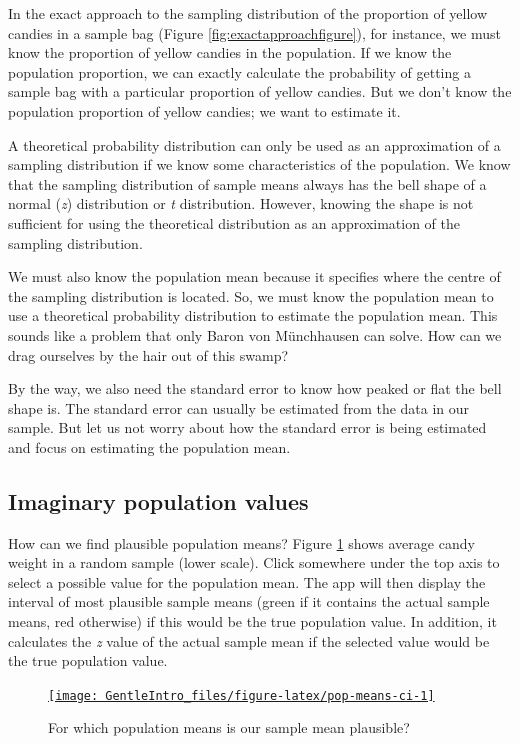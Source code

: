 \documentclass[a4paper]{book}
\theoremstyle{definition}
\theoremstyle{definition}
\theoremstyle{definition}
\theoremstyle{remark}
\begin{document}
In the exact approach to the sampling distribution of the proportion of
yellow candies in a sample bag (Figure \ref{fig:exactapproachfigure}),
for instance, we must know the proportion of yellow candies in the
population. If we know the population proportion, we can exactly
calculate the probability of getting a sample bag with a particular
proportion of yellow candies. But we don't know the population
proportion of yellow candies; we want to estimate it.

A theoretical probability distribution can only be used as an
approximation of a sampling distribution if we know some characteristics
of the population. We know that the sampling distribution of sample
means always has the bell shape of a normal (\emph{z}) distribution or
\emph{t} distribution. However, knowing the shape is not sufficient for
using the theoretical distribution as an approximation of the sampling
distribution.

We must also know the population mean because it specifies where the
centre of the sampling distribution is located. So, we must know the
population mean to use a theoretical probability distribution to
estimate the population mean. This sounds like a problem that only Baron
von Münchhausen can solve. How can we drag ourselves by the hair out of
this swamp?

By the way, we also need the standard error to know how peaked or flat
the bell shape is. The standard error can usually be estimated from the
data in our sample. But let us not worry about how the standard error is
being estimated and focus on estimating the population mean.

\subsection{Imaginary population values}\label{imag-pop-values}

How can we find plausible population means? Figure
\ref{fig:pop-means-ci} shows average candy weight in a random sample
(lower scale). Click somewhere under the top axis to select a possible
value for the population mean. The app will then display the interval of
most plausible sample means (green if it contains the actual sample
means, red otherwise) if this would be the true population value. In
addition, it calculates the \emph{z} value of the actual sample mean if
the selected value would be the true population value.

\begin{figure}[H]
\href{http://82.196.4.233:3838/apps/pop-means-ci/}{\texttt{[image: GentleIntro\_files/figure-latex/pop-means-ci-1]} }\caption{For which population means is our sample mean plausible?}\label{fig:pop-means-ci}
\end{figure}
\end{document}
